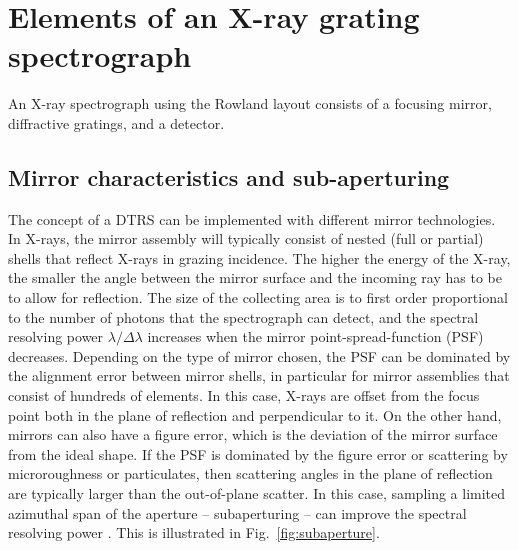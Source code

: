 \documentclass[linenumbers]{aastex631}
\begin{document}
\section{Elements of an X-ray grating spectrograph}
\label{sect:elements}
An X-ray spectrograph using the Rowland layout consists of a focusing mirror, diffractive gratings, and a detector.

\subsection{Mirror characteristics and sub-aperturing}
The concept of a DTRS can be implemented with different mirror technologies. In X-rays, the mirror assembly will typically consist of nested (full or partial) shells that reflect X-rays in grazing incidence. The higher the energy of the X-ray, the smaller the angle between the mirror surface and the incoming ray has to be to allow for reflection. The size of the collecting area is to first order proportional to the number of photons that the spectrograph can detect, and the spectral resolving power $\lambda / \Delta \lambda$ increases when the mirror point-spread-function (PSF) decreases. Depending on the type of mirror chosen, the PSF can be dominated by the alignment error between mirror shells, in particular for mirror assemblies that consist of hundreds of elements. In this case, X-rays are offset from the focus point both in the plane of reflection and perpendicular to it.
On the other hand, mirrors can also have a figure error, which is the deviation of the mirror surface from the ideal shape. If the PSF is dominated by the figure error or scattering by microroughness or particulates, then scattering angles in the plane of reflection are typically larger than the out-of-plane scatter. In this case, sampling a limited azimuthal span of the aperture -- subaperturing -- can improve the spectral resolving power \citep{1987ApOpt..26.2915C}. This is illustrated in Fig.~\ref{fig:subaperture}.
\end{document}
